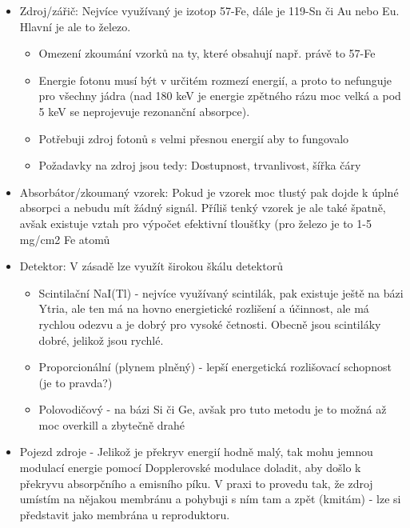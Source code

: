 \begin{itemize}
    \item Zdroj/zářič: Nejvíce využívaný je izotop 57-Fe, dále je 119-Sn či Au nebo Eu. Hlavní je ale to železo.
        \begin{itemize}
            \item Omezení zkoumání vzorků na ty, které obsahují např. právě to 57-Fe
            \item Energie fotonu musí být v určitém rozmezí energií, a proto to nefunguje pro všechny jádra (nad 180 keV je energie zpětného rázu moc velká a pod 5 keV se neprojevuje rezonanční absorpce).
            \item Potřebuji zdroj fotonů s velmi přesnou energií aby to fungovalo
            \item Požadavky na zdroj jsou tedy: Dostupnost, trvanlivost, šířka čáry
        \end{itemize}
    \item Absorbátor/zkoumaný vzorek: Pokud je vzorek moc tlustý pak dojde k úplné absorpci a nebudu mít žádný signál. Příliš tenký vzorek je ale také špatně, avšak existuje vztah pro výpočet efektivní tloušťky (pro železo je to 1-5 mg/cm2 Fe atomů

    \item Detektor: V zásadě lze využít širokou škálu detektorů
        \begin{itemize}
            \item Scintilační NaI(Tl) - nejvíce využívaný scintilák, pak existuje ještě na bázi Ytria, ale ten má na hovno energietické rozlišení a účinnost, ale má rychlou odezvu a je dobrý pro vysoké četnosti. Obecně jsou scintiláky dobré, jelikož jsou rychlé.
            \item Proporcionální (plynem plněný) - lepší energetická rozlišovací schopnost (je to pravda?)
            \item Polovodičový - na bázi Si či Ge, avšak pro tuto metodu je to možná až moc overkill a zbytečně drahé
        \end{itemize}

    \item Pojezd zdroje - Jelikož je překryv energií hodně malý, tak mohu jemnou modulací energie pomocí Dopplerovské modulace doladit, aby došlo k překryvu absorpčního a emisního píku. V praxi to provedu tak, že zdroj umístím na nějakou membránu a pohybuji s ním tam a zpět (kmitám) - lze si představit jako membrána u reproduktoru.
\end{itemize}

